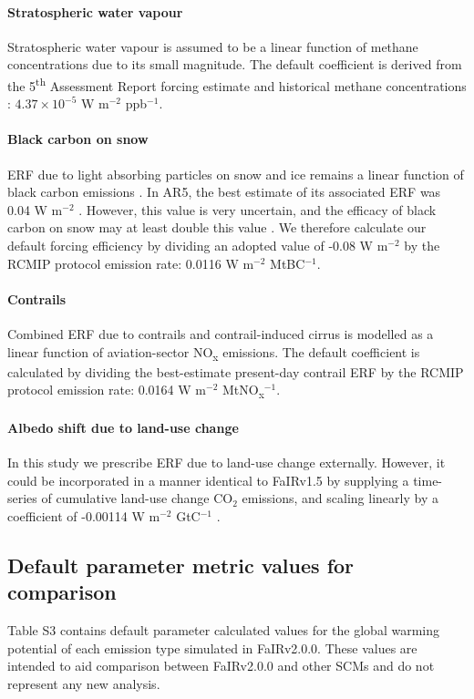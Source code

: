 \documentclass[gmd, manuscript]{copernicus}
\begin{document}
\paragraph*{Stratospheric water vapour}
Stratospheric water vapour is assumed to be a linear function of methane concentrations \citep{Smith2018} due to its small magnitude. The default coefficient is derived from the 5\textsuperscript{th} Assessment Report forcing estimate \citep{Myhre2013a} and historical methane concentrations \citep{Meinshausen2017}: $4.37\times10^{-5}$ W m$^{-2}$ ppb$^{-1}$.
\paragraph*{Black carbon on snow}
ERF due to light absorbing particles on snow and ice remains a linear function of black carbon emissions \citep{Smith2018}. In AR5, the best estimate of its associated ERF was 0.04 W m$^{-2}$ \citep{Myhre2013a}. However, this value is very uncertain, and the efficacy of black carbon on snow may at least double this value \citep{Bond2013}. We therefore calculate our default forcing efficiency by dividing an adopted value of -0.08 W m$^{-2}$ by the RCMIP protocol emission rate: 0.0116 W m$^{-2}$ MtBC$^{-1}$.
\paragraph*{Contrails}
Combined ERF due to contrails and contrail-induced cirrus is modelled as a linear function of aviation-sector NO\textsubscript{x} emissions. The default coefficient is calculated by dividing the best-estimate present-day contrail ERF \citep{Lee2020} by the RCMIP protocol emission rate: 0.0164 W m$^{-2}$ MtNO\textsubscript{x}$^{-1}$.
\paragraph*{Albedo shift due to land-use change}
In this study we prescribe ERF due to land-use change externally. However, it could be incorporated in a manner identical to FaIRv1.5 by supplying a time-series of cumulative land-use change CO$_2$ emissions, and scaling linearly by a coefficient of -0.00114 W m$^{-2}$ GtC$^{-1}$ \citep{Smith2018}.
\subsection{Default parameter metric values for comparison}
Table S3 contains default parameter calculated values for the global warming potential \citep{Lashof1990} of each emission type simulated in FaIRv2.0.0. These values are intended to aid comparison between FaIRv2.0.0 and other SCMs and do not represent any new analysis.
\end{document}
